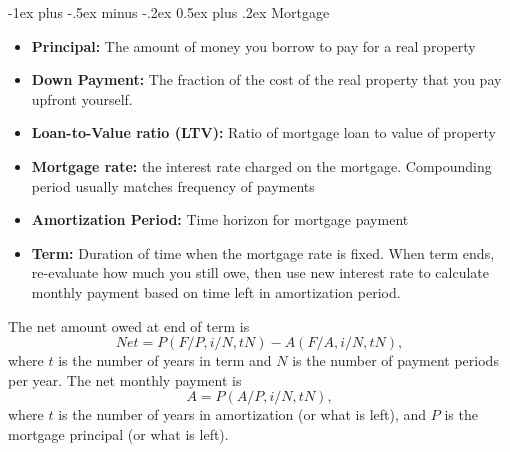 \documentclass[11pt,landscape]{article}
\makeatletter
\renewcommand{\section}{\@startsection{section}{1}{0mm}%
                                {-1ex plus -.5ex minus -.2ex}%
                                {0.5ex plus .2ex}%
                                {\normalfont\large\bfseries}}
\makeatother
\begin{document}
\begin{multicols*}{3}
\section{Mortgage}
\begin{itemize}
    \item \textbf{Principal:} The amount of money you borrow to pay for a real property
    \item \textbf{Down Payment:} The fraction of the cost of the real property that you pay upfront yourself.
    \item \textbf{Loan-to-Value ratio (LTV):} Ratio of mortgage loan to value of property
    \item \textbf{Mortgage rate:} the interest rate charged on the mortgage. Compounding period usually matches frequency of payments
    \item \textbf{Amortization Period:} Time horizon for mortgage payment
    \item \textbf{Term:} Duration of time when the mortgage rate is fixed. When term ends, re-evaluate how much you still owe, then use new interest rate to calculate monthly payment based on time left in amortization period.
\end{itemize}
The net amount owed at end of term is 
\begin{equation*}
    Net = P\left(F/P, i/N, tN\right) - A\left(F/A, i/N, tN\right),
\end{equation*}
where $t$ is the number of years in term and $N$ is the number of payment periods per year. The net monthly payment is 
\begin{equation*}
    A = P\left(A/P, i/N, tN\right),
\end{equation*}
where $t$ is the number of years in amortization (or what is left), and $P$ is the mortgage principal (or what is left).

\end{multicols*}
\end{document}
